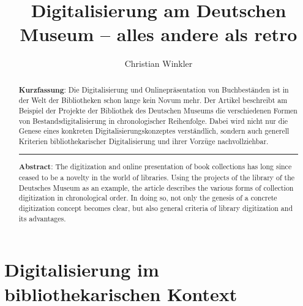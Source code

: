 \documentclass[a4paper,
fontsize=11pt,
oneside,
numbers=noperiodatend,
parskip=half-,
bibliography=totoc,
final
]{scrartcl}
\title{\LARGE{Digitalisierung am Deutschen Museum – alles andere als retro}}%
\author{Christian Winkler} %
\date{}
\begin{document}
\maketitle
\thispagestyle{fancyplain} 

\begin{abstract}
\noindent
\textbf{Kurzfassung}: Die Digitalisierung und Onlinepräsentation von
Buchbeständen ist in der Welt der Bibliotheken schon lange kein Novum
mehr. Der Artikel beschreibt am Beispiel der Projekte der Bibliothek des
Deutschen Museums die verschiedenen Formen von Bestandsdigitalisierung
in chronologischer Reihenfolge. Dabei wird nicht nur die Genese eines
konkreten Digitalisierungskonzeptes verständlich, sondern auch generell
Kriterien bibliothekarischer Digitalisierung und ihrer Vorzüge
nachvollziehbar.

\begin{center}\rule{0.5\linewidth}{0.5pt}\end{center}

\noindent\textbf{Abstract}: The digitization and online presentation of book
collections has long since ceased to be a novelty in the world of
libraries. Using the projects of the library of the Deutsches Museum as
an example, the article describes the various forms of collection
digitization in chronological order. In doing so, not only the genesis
of a concrete digitization concept becomes clear, but also general
criteria of library digitization and its advantages.
\end{abstract}


\hypertarget{digitalisierung-im-bibliothekarischen-kontext}{%
\section{Digitalisierung im bibliothekarischen
Kontext}\label{digitalisierung-im-bibliothekarischen-kontext}}
\end{document}

